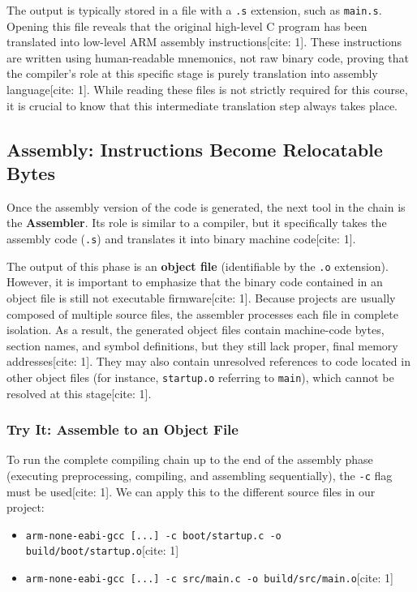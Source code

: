The output is typically stored in a file with a \texttt{.s} extension, such as \texttt{main.s}. Opening this file reveals that the original high-level C program has been translated into low-level ARM assembly instructions[cite: 1]. These instructions are written using human-readable mnemonics, not raw binary code, proving that the compiler's role at this specific stage is purely translation into assembly language[cite: 1]. While reading these files is not strictly required for this course, it is crucial to know that this intermediate translation step always takes place.

\subsection{Assembly: Instructions Become Relocatable Bytes}
Once the assembly version of the code is generated, the next tool in the chain is the \textbf{Assembler}. Its role is similar to a compiler, but it specifically takes the assembly code (\texttt{.s}) and translates it into binary machine code[cite: 1]. 

The output of this phase is an \textbf{object file} (identifiable by the \texttt{.o} extension). However, it is important to emphasize that the binary code contained in an object file is still not executable firmware[cite: 1]. Because projects are usually composed of multiple source files, the assembler processes each file in complete isolation. As a result, the generated object files contain machine-code bytes, section names, and symbol definitions, but they still lack proper, final memory addresses[cite: 1]. They may also contain unresolved references to code located in other object files (for instance, \texttt{startup.o} referring to \texttt{main}), which cannot be resolved at this stage[cite: 1].

\subsubsection{Try It: Assemble to an Object File}
To run the complete compiling chain up to the end of the assembly phase (executing preprocessing, compiling, and assembling sequentially), the \texttt{-c} flag must be used[cite: 1]. We can apply this to the different source files in our project:
\begin{itemize}
    \item \texttt{arm-none-eabi-gcc [...] -c boot/startup.c -o build/boot/startup.o}[cite: 1]
    \item \texttt{arm-none-eabi-gcc [...] -c src/main.c -o build/src/main.o}[cite: 1]
\end{itemize}

